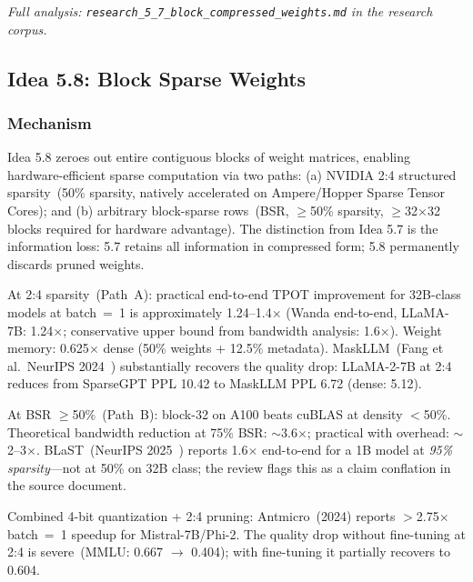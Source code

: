\documentclass[11pt]{article}
\begin{document}
\par\noindent\textit{Full analysis: \texttt{research\_5\_7\_block\_compressed\_weights.md} in the research corpus.}


\subsection{Idea 5.8: Block Sparse Weights}
\label{subsec:idea58}

\subsubsection*{Mechanism}

Idea 5.8 zeroes out entire contiguous blocks of weight matrices, enabling hardware-efficient sparse computation via two paths: (a) NVIDIA 2:4 structured sparsity~(50\% sparsity, natively accelerated on Ampere/Hopper Sparse Tensor Cores); and (b) arbitrary block-sparse rows~(BSR, $\geq$50\% sparsity, $\geq$32$\times$32 blocks required for hardware advantage). The distinction from Idea 5.7 is the information loss: 5.7 retains all information in compressed form; 5.8 permanently discards pruned weights.

At 2:4 sparsity~(Path~A): practical end-to-end TPOT improvement for 32B-class models at batch~=~1 is approximately 1.24--1.4$\times$ (Wanda end-to-end, LLaMA-7B: 1.24$\times$; conservative upper bound from bandwidth analysis: 1.6$\times$). Weight memory: 0.625$\times$ dense (50\% weights + 12.5\% metadata). MaskLLM~(Fang et al.\ NeurIPS 2024~\cite{FangMaskLLM2024}) substantially recovers the quality drop: LLaMA-2-7B at 2:4 reduces from SparseGPT PPL 10.42 to MaskLLM PPL 6.72 (dense: 5.12).

At BSR $\geq$50\%~(Path~B): block-32 on A100 beats cuBLAS at density $<$50\%. Theoretical bandwidth reduction at 75\% BSR: $\sim$3.6$\times$; practical with overhead: $\sim$2--3$\times$. BLaST~(NeurIPS 2025~\cite{BLaST2025}) reports 1.6$\times$ end-to-end for a 1B model at \emph{95\% sparsity}---not at 50\% on 32B class; the review flags this as a claim conflation in the source document.

Combined 4-bit quantization + 2:4 pruning: Antmicro~(2024) reports $>$2.75$\times$ batch~=~1 speedup for Mistral-7B/Phi-2. The quality drop without fine-tuning at 2:4 is severe~(MMLU: 0.667 $\to$ 0.404); with fine-tuning it partially recovers to 0.604.
\end{document}

